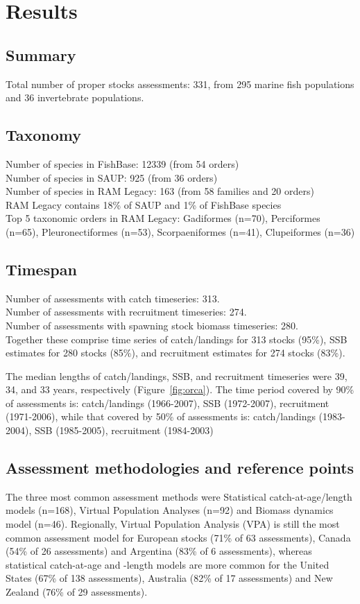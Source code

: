 \section*{Results}
\subsection*{Summary}
\noindent
Total number of proper stocks assessments: 331, from 295 marine fish populations and 36
invertebrate populations.

\subsection*{Taxonomy}
\noindent

Number of species in FishBase: 12339 (from 54 orders) \\
Number of species in SAUP: 925 (from 36 orders)\\
Number of species in RAM Legacy: 163 (from 58 families and 20 orders) \\
RAM Legacy contains 18\% of SAUP and 1\% of FishBase species\\
Top 5 taxonomic orders in RAM Legacy: Gadiformes (n=70), Perciformes (n=65), Pleuronectiformes (n=53), Scorpaeniformes (n=41), Clupeiformes (n=36) \\

\subsection*{Timespan}
\noindent
Number of assessments with catch timeseries: 313.\\
Number of assessments with recruitment timeseries: 274.\\
Number of assessments with spawning stock biomass timeseries: 280.\\

Together these comprise time series of
catch/landings for 313 stocks (95\%),
SSB estimates for 280 stocks (85\%), and recruitment estimates for
274 stocks (83\%).

The median lengths of catch/landings, SSB, and recruitment timeseries
were 39, 34, and 33
years, respectively (Figure~\ref{fig:orca}).  The time period covered by 90\% of assessments
is: catch/landings (1966-2007), SSB
(1972-2007), recruitment (1971-2006), while that
covered by 50\% of assessments is: catch/landings
(1983-2004), SSB (1985-2005), recruitment
(1984-2003)
 
\subsection*{Assessment methodologies and reference points}
\noindent
The three most common assessment methods were
Statistical catch-at-age/length models (n=168), Virtual Population Analyses (n=92) and
Biomass dynamics model (n=46). Regionally, Virtual Population Analysis
(VPA) is still the most common assessment model for European stocks
(71\% of 63 assessments),
Canada (54\% of 26
assessments) and Argentina (83\% of
6 assessments), whereas statistical catch-at-age
and -length models are more common for the United States
(67\% of 138 assessments),
Australia (82\% of 17
assessments) and New Zealand (76\% of
29 assessments).


